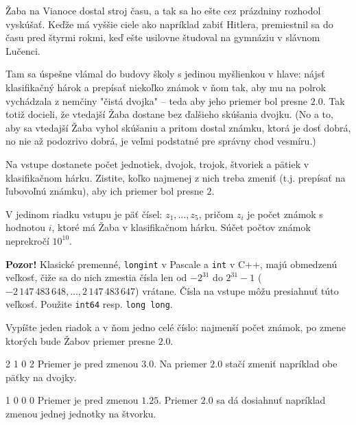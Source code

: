 




Žaba na Vianoce dostal stroj času, a tak sa ho ešte cez prázdniny rozhodol vyskúšať. Keďže má vyššie ciele
ako napríklad zabiť Hitlera, premiestnil sa do času pred štyrmi rokmi, keď ešte usilovne študoval na gymnáziu v slávnom
Lučenci.

Tam sa úspešne vlámal do budovy školy s jedinou myšlienkou v hlave: nájsť klasifikačný hárok a prepísať
niekoľko známok v ňom tak, aby mu na polrok vychádzala z nemčiny "čistá dvojka" -- teda aby jeho priemer bol
presne $2.0$. Tak totiž docieli, že vtedajší Žaba dostane bez ďalšieho skúšania dvojku. (No a to, aby sa vtedajší
Žaba vyhol skúšaniu a pritom dostal známku, ktorá je dosť dobrá, no nie až podozrivo dobrá, je veľmi podstatné
pre správny chod vesmíru.)


Na vstupe dostanete počet jednotiek, dvojok, trojok, štvoriek a pätiek v klasifikačnom hárku. Zistite,
koľko najmenej z nich treba zmeniť (t.j. prepísať na ľubovoľnú známku), aby ich priemer bol presne $2$.


V jedinom riadku vstupu je päť čísel:  $z_1,\ldots,z_5$, pričom $z_i$ je počet známok s hodnotou $i$, ktoré má Žaba
v klasifikačnom hárku. Súčet počtov známok neprekročí $10^{10}$.

\textbf{Pozor!} Klasické premenné, \verb!longint! v Pascale a \verb!int! v C++, majú obmedzenú
veľkosť, čiže sa do nich zmestia čísla len od $-2^{31}$ do $2^{31}-1$ ($-2\,147\,483\,648,\dots,
2\,147\,483\,647$) vrátane. Čísla na vstupe môžu presiahnuť túto veľkosť. Použite
\verb!int64! resp. \verb!long long!.


Vypíšte jeden riadok a v ňom jedno celé číslo: najmenší počet známok, po zmene ktorých bude Žabov priemer
presne $2.0$.


 2 1 0 2
\komentar
Priemer je pred zmenou $3.0$. Na priemer $2.0$ stačí zmeniť napríklad obe päťky na dvojky.
\koniec

 1 0 0 0
\komentar
Priemer je pred zmenou $1.25$. Priemer $2.0$ sa dá dosiahnuť napríklad zmenou jednej jednotky na štvorku.
\koniec


